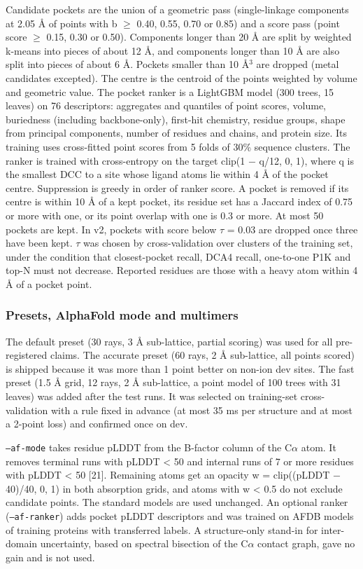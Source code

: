 \documentclass[10pt,letterpaper]{article}
\begin{document}
Candidate pockets are the union of a geometric pass (single-linkage components at 2.05 \AA{} of points with b $\ge$ 0.40, 0.55, 0.70 or 0.85) and a score pass (point score $\ge$ 0.15, 0.30 or 0.50). Components longer than 20 \AA{} are split by weighted k-means into pieces of about 12 \AA{}, and components longer than 10 \AA{} are also split into pieces of about 6 \AA{}. Pockets smaller than 10 \AA{}$^{3}$ are dropped (metal candidates excepted). The centre is the centroid of the points weighted by volume and geometric value. The pocket ranker is a LightGBM model (300 trees, 15 leaves) on 76 descriptors: aggregates and quantiles of point scores, volume, buriedness (including backbone-only), first-hit chemistry, residue groups, shape from principal components, number of residues and chains, and protein size. Its training uses cross-fitted point scores from 5 folds of 30\% sequence clusters. The ranker is trained with cross-entropy on the target clip(1 $-$ q/12, 0, 1), where q is the smallest DCC to a site whose ligand atoms lie within 4 \AA{} of the pocket centre. Suppression is greedy in order of ranker score. A pocket is removed if its centre is within 10 \AA{} of a kept pocket, its residue set has a Jaccard index of 0.75 or more with one, or its point overlap with one is 0.3 or more. At most 50 pockets are kept. In v2, pockets with score below $\tau$ = 0.03 are dropped once three have been kept. $\tau$ was chosen by cross-validation over clusters of the training set, under the condition that closest-pocket recall, DCA4 recall, one-to-one P1K and top-N must not decrease. Reported residues are those with a heavy atom within 4 \AA{} of a pocket point.

\subsubsection*{Presets, AlphaFold mode and multimers}

The default preset (30 rays, 3 \AA{} sub-lattice, partial scoring) was used for all pre-registered claims. The accurate preset (60 rays, 2 \AA{} sub-lattice, all points scored) is shipped because it was more than 1 point better on non-ion dev sites. The fast preset (1.5 \AA{} grid, 12 rays, 2 \AA{} sub-lattice, a point model of 100 trees with 31 leaves) was added after the test runs. It was selected on training-set cross-validation with a rule fixed in advance (at most 35 ms per structure and at most a 2-point loss) and confirmed once on dev.

\texttt{--af-mode} takes residue pLDDT from the B-factor column of the C$\alpha$ atom. It removes terminal runs with pLDDT \textless{} 50 and internal runs of 7 or more residues with pLDDT \textless{} 50 [21]. Remaining atoms get an opacity w = clip((pLDDT $-$ 40)/40, 0, 1) in both absorption grids, and atoms with w \textless{} 0.5 do not exclude candidate points. The standard models are used unchanged. An optional ranker (\texttt{--af-ranker}) adds pocket pLDDT descriptors and was trained on AFDB models of training proteins with transferred labels. A structure-only stand-in for inter-domain uncertainty, based on spectral bisection of the C$\alpha$ contact graph, gave no gain and is not used.
\end{document}
